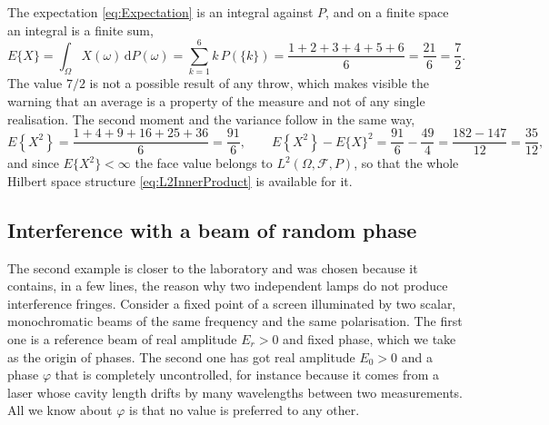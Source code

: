 		The expectation \eqref{eq:Expectation} is an integral against $P$, and on a finite space
		an integral is a finite sum,
		\begin{equation*}
			E\{X\} = \int_{\Omega}X(\omega)\,\mathrm{d}P(\omega) = \sum_{k=1}^{6}k\,P(\{k\})
			= \frac{1+2+3+4+5+6}{6} = \frac{21}{6} = \frac{7}{2}.
		\end{equation*}
		The value $7/2$ is not a possible result of any throw, which makes visible the warning
		that an average is a property of the measure and not of any single realisation. The
		second moment and the variance follow in the same way,
		\begin{equation*}
			E\left\{X^{2}\right\} = \frac{1+4+9+16+25+36}{6} = \frac{91}{6},
			\qquad
			E\left\{X^{2}\right\} - E\{X\}^{2} = \frac{91}{6} - \frac{49}{4}
			= \frac{182-147}{12} = \frac{35}{12},
		\end{equation*}
		and since $E\{X^{2}\}<\infty$ the face value belongs to $L^{2}(\Omega,\mathcal{F},P)$,
		so that the whole Hilbert space structure \eqref{eq:L2InnerProduct} is available for it.

	\subsection{Interference with a beam of random phase}

		The second example is closer to the laboratory and was chosen because it contains, in a
		few lines, the reason why two independent lamps do not produce interference fringes.
		Consider a fixed point of a screen illuminated by two scalar, monochromatic beams of the
		same frequency and the same polarisation. The first one is a reference beam of real
		amplitude $E_{r}>0$ and fixed phase, which we take as the origin of phases. The second
		one has got real amplitude $E_{0}>0$ and a phase $\varphi$ that is completely
		uncontrolled, for instance because it comes from a laser whose cavity length drifts by
		many wavelengths between two measurements. All we know about $\varphi$ is that no value
		is preferred to any other.

